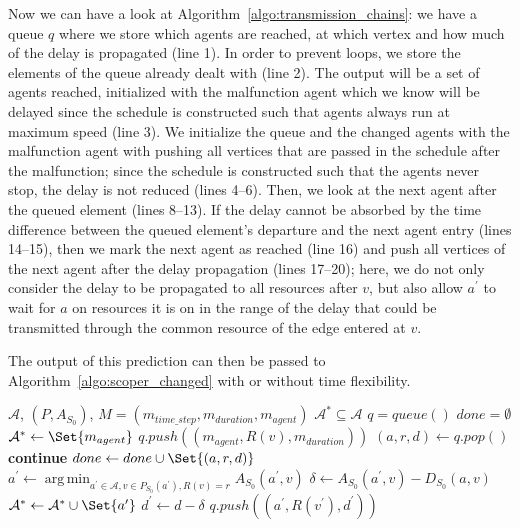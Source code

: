\documentclass{article}
\DeclareMathOperator*{\argmin}{arg\,min}
\begin{document}
Now we can have a look at Algorithm~\ref{algo:transmission_chains}: we have a queue $q$ where we store which agents are reached, at which vertex and how much of the delay is propagated (line 1). In order to prevent loops, we store the elements of the queue already dealt with (line 2).  The output will be a set of agents reached, initialized with the malfunction agent which we know will be delayed since the schedule is constructed such that agents always run at maximum speed (line 3).
We initialize the queue and the changed agents with the malfunction agent with pushing all vertices that are passed in the schedule after the malfunction; since the schedule is constructed such that the agents never stop, the delay is not reduced (lines 4--6).
Then, we look at the next agent after the queued element (lines 8--13). If the delay cannot be absorbed by the time difference between the queued element's departure and the next agent entry (lines 14--15), then we mark the next agent as reached (line 16) and push all vertices of the next agent after the delay propagation (lines 17--20); here, we do not only consider the delay to be propagated to all resources after $v$, but also allow $a^\prime$ to wait for $a$ on resources it is on in the range of the delay that could be transmitted through the common resource of the edge entered at $v$.


The output of this prediction can then be passed to Algorithm~\ref{algo:scoper_changed} with or without time flexibility.






\begin{algorithm}
	\caption{$changed\_transmission\_chains$} \label{algo:transmission_chains}
	\begin{algorithmic}[1]
		\Require $\mathcal{A}$, $(P,A_{S_0})$, $M=(m_{time\_step},m_{duration},m_{agent})$
	    \Ensure $\mathcal{A}^* \subseteq \mathcal{A}$
	    \State $q = queue()$
	    \State $done = \emptyset$
	    \State $\mathcal{A}^* \leftarrow \Set{m_{agent}}$
	        \State $q.push((m_{agent},R(v),m_{duration}))$
	    \EndFor
            \State $(a,r,d) \leftarrow q.pop()$
                \State \textbf{continue}
            \EndIf
            \State $done \leftarrow done \cup \Set{(a,r,d)}$
            \State $a^\prime \leftarrow \argmin_{a^\prime \in \mathcal{A}, v \in P_{S_0}(a^\prime), R(v)=r} A_{S_0}(a^\prime,v)$
            \State $\delta \leftarrow A_{S_0}(a^\prime,v) - D_{S_0}(a,v)$
                \State $\mathcal{A}^* \leftarrow \mathcal{A}^* \cup \Set{a^\prime}$
                \State $d^\prime \leftarrow d-\delta$
    	            \State $q.push((a^\prime,R(v^\prime),d^\prime))$
    	        \EndFor
            \EndIf{}

	    \EndWhile

	\end{algorithmic}
\end{algorithm}
\end{document}
